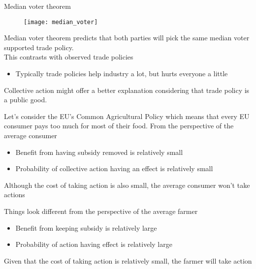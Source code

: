 \documentclass{beamer}
\begin{document}
\begin{frame}{Median voter theorem}
  \begin{figure}
    \texttt{[image: median\_voter]}
  \end{figure}
\end{frame}

\begin{frame}
  Median voter theorem predicts that both parties will pick the same median voter supported trade policy. \\
  This contrasts with observed trade policies
  \begin{itemize}
    \item Typically trade policies help industry a lot, but hurts everyone a little
  \end{itemize}
  \medskip
  Collective action might offer a better explanation considering that trade policy is a public good.    
\end{frame}

\begin{frame}
  Let's consider the EU's Common Agricultural Policy which means that every EU consumer pays too much for most of their food. 
  From the perspective of the average consumer
  \begin{itemize}
    \item Benefit from having subsidy removed is relatively small
    \item Probability of collective action having an effect is relatively small
  \end{itemize}
  \medskip
  Although the cost of taking action is also small, the average consumer won't take actions  
\end{frame}

\begin{frame}
Things look different from the perspective of the average farmer
\begin{itemize}
    \item Benefit from keeping subsidy is relatively large
    \item Probability of action having effect is relatively large
  \end{itemize}
  \medskip
  Given that the cost of taking action is relatively small, the farmer will take action
\end{frame}
\end{document}
